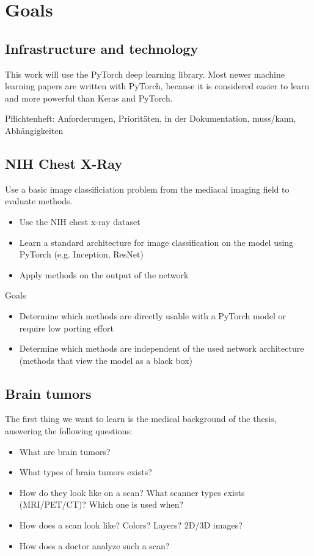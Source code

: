 \chapter*{Goals}

\section{Infrastructure and technology}
This work will use the PyTorch\cite{paszke2017automatic} deep learning library. Most newer machine learning papers are written with PyTorch, because it is considered easier to learn and more powerful than Keras and PyTorch\cite{pytorchvstensorflow}.



\iffalse
Pflichtenheft: Anforderungen, Prioritäten, in der Dokumentation, muss/kann, Abhängigkeiten

\section*{NIH Chest X-Ray}
Use a basic image classificiation problem from the mediacal imaging field to evaluate methods.
\begin{itemize}
    \item Use the NIH chest x-ray dataset
    \item Learn a standard architecture for image classification on the model using PyTorch (e.g. Inception, ResNet)
    \item Apply methods on the output of the network
\end{itemize}
Goals
\begin{itemize}
    \item Determine which methods are directly usable with a PyTorch model or require low porting effort
    \item Determine which methods are independent of the used network architecture (methods that view the model as a black box)
\end{itemize}

\section*{Brain tumors}
The first thing we want to learn is the medical background of the thesis, answering the following questions:
\begin{itemize}
    \item What are brain tumors?
    \item What types of brain tumors exists?
    \item How do they look like on a scan? What scanner types exists (MRI/PET/CT)? Which one is used when?
    \item How does a scan look like? Colors? Layers? 2D/3D images?
    \item How does a doctor analyze such a scan?
\end{itemize}

